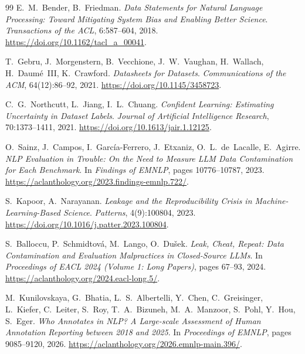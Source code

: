 \documentclass[11pt,a4paper]{article}
\begin{document}
\begin{thebibliography}{99}
E.~M.~Bender, B.~Friedman.
\newblock \emph{Data Statements for Natural Language Processing: Toward Mitigating System Bias and Enabling Better Science}.
\newblock \emph{Transactions of the ACL}, 6:587--604, 2018.
\newblock \url{https://doi.org/10.1162/tacl_a_00041}.

T.~Gebru, J.~Morgenstern, B.~Vecchione, J.~W.~Vaughan, H.~Wallach,
H.~Daum\'e~III, K.~Crawford.
\newblock \emph{Datasheets for Datasets}.
\newblock \emph{Communications of the ACM}, 64(12):86--92, 2021.
\newblock \url{https://doi.org/10.1145/3458723}.

C.~G.~Northcutt, L.~Jiang, I.~L.~Chuang.
\newblock \emph{Confident Learning: Estimating Uncertainty in Dataset Labels}.
\newblock \emph{Journal of Artificial Intelligence Research}, 70:1373--1411, 2021.
\newblock \url{https://doi.org/10.1613/jair.1.12125}.

O.~Sainz, J.~Campos, I.~Garc\'ia-Ferrero, J.~Etxaniz,
O.~L.~de~Lacalle, E.~Agirre.
\newblock \emph{NLP Evaluation in Trouble: On the Need to Measure LLM Data Contamination for Each Benchmark}.
\newblock In \emph{Findings of EMNLP}, pages 10776--10787, 2023.
\newblock \url{https://aclanthology.org/2023.findings-emnlp.722/}.

S.~Kapoor, A.~Narayanan.
\newblock \emph{Leakage and the Reproducibility Crisis in Machine-Learning-Based Science}.
\newblock \emph{Patterns}, 4(9):100804, 2023.
\newblock \url{https://doi.org/10.1016/j.patter.2023.100804}.

S.~Balloccu, P.~Schmidtov\'a, M.~Lango, O.~Du\v{s}ek.
\newblock \emph{Leak, Cheat, Repeat: Data Contamination and Evaluation Malpractices in Closed-Source LLMs}.
\newblock In \emph{Proceedings of EACL 2024 (Volume 1: Long Papers)}, pages 67--93, 2024.
\newblock \url{https://aclanthology.org/2024.eacl-long.5/}.

M.~Kunilovskaya, G.~Bhatia, L.~S.~Albertelli, Y.~Chen, C.~Greisinger,
L.~Kiefer, C.~Leiter, S.~Roy, T.~A.~Bizuneh, M.~A.~Manzoor, S.~Pohl,
Y.~Hou, S.~Eger.
\newblock \emph{Who Annotates in NLP? A Large-scale Assessment of Human Annotation Reporting between 2018 and 2025}.
\newblock In \emph{Proceedings of EMNLP}, pages 9085--9120, 2026.
\newblock \url{https://aclanthology.org/2026.emnlp-main.396/}.


\end{thebibliography}
\end{document}
